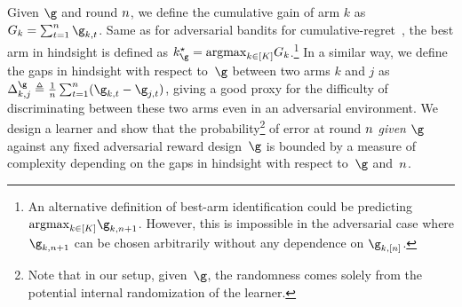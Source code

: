 Given $\gainVector$ and round $n$, we define the
cumulative gain of arm $k$ as
$\cumulGain_k=\sum_{t=1}^{\timeHorizon}\gainVector_{k,t}$.  Same
as for adversarial bandits for cumulative-regret~\citep{Auer02NM}, the best arm in hindsight is defined as
$\bestArm_{\gainVector}= \argmax_{k\in\setArms}
\cumulGain_{k}$.\footnote{An alternative definition of best-arm identification
	could be predicting
	$\argmax_{k\in\setArms}\gainVector_{k,\timeHorizon+1}$. However, this
	is impossible in the adversarial case where
	$\gainVector_{k,\timeHorizon+1}$ can be chosen arbitrarily without
	any dependence on $\gainVector_{k,[\timeHorizon]}$.}
In a similar way, we define the gaps in hindsight with respect to~$\gainVector$ between two arms $k$ and 
$j$ as $\gap^\gainVector_{k,j}\triangleq\frac{1}{\timeHorizon}
\sum_{t=1}^{\timeHorizon}(\gainVector_{k,t}-\gainVector_{j,t})$, 
giving a good proxy for the difficulty of discriminating between
these two arms even in an adversarial environment. 
We design a learner and show that the probability\footnote{Note that in our setup, 
	given~$\gainVector$, the randomness comes solely from the potential 
	internal randomization of the learner.} of error at round $n$ \emph{given} $\gainVector$ 
	against 
any fixed adversarial reward design~$\gainVector$
	is 
bounded by a measure of complexity depending on the 
gaps in hindsight with respect to~$\gainVector$ and~$n$. 

